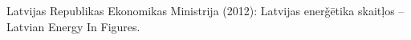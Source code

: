 \documentclass{scrreprt}
\begin{document}
Latvijas Republikas Ekonomikas Ministrija  (2012): Latvijas ener\v{g}\={e}tika skait\c{l}os  -- Latvian Energy In Figures.
 
\end{document}
